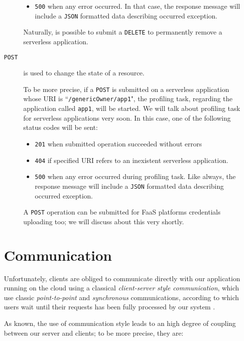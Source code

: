 \documentclass[12pt,a4paper]{report}
\newcommand{\QuoteIntro}{``}
\begin{document}
\begin{description}
\begin{itemize}
		\item \texttt{500} when any error occurred. In that case, the response message will include a \texttt{JSON} formatted data describing occurred exception.
	\end{itemize}

	Naturally, is possible to submit a \texttt{DELETE} to permanently remove a serverless application. 
	
	\item[\texttt{POST}] is used to change the state of a resource.
	
	To be more precise, if a \texttt{POST} is submitted on a serverless application whose URI is \QuoteIntro\texttt{/genericOwner/app1}", the profiling task, regarding the application called \texttt{app1}, will be started. We will talk about profiling task for serverless applications very soon. In this case, one of the following status codes will be sent:
	
	\begin{itemize}
		\item \texttt{201} when submitted operation succeeded without errors
		
		\item \texttt{404} if specified URI refers to an inexistent serverless application.
		
		\item \texttt{500} when any error occurred during profiling task. Like always, the response message will include a \texttt{JSON} formatted data describing occurred exception.
	\end{itemize}
	
	A \texttt{POST} operation can be submitted for FaaS platforms credentials uploading too; we will discuss about this very shortly. 
	
\end{description}	

\section{Communication}

Unfortunately, clients are obliged to communicate directly with our application running on the cloud using a classical \textit{client-server style communication}, which use classic \textit{point-to-point} and \textit{synchronous} communications, according to which users wait until their requests has been fully processed by our system \cite{SDCC}. 

As known, the use of communication style leads to an high degree of coupling between our server and clients; to be more precise, they are: 
\end{document}
